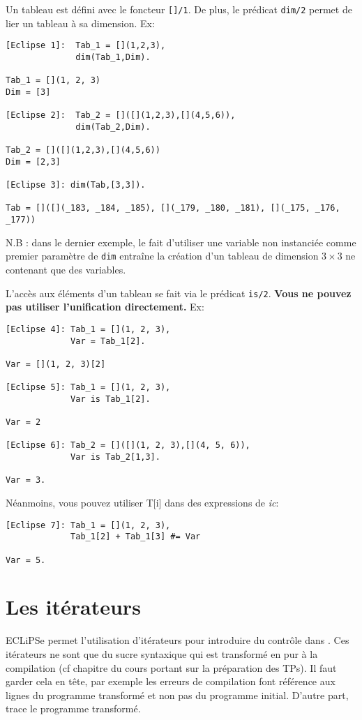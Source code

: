 Un tableau est défini avec le foncteur \verb|[]/1|. De plus, le
prédicat \verb|dim/2| permet de lier un tableau à sa dimension. Ex:
\begin{verbatim}
[Eclipse 1]:  Tab_1 = [](1,2,3),
              dim(Tab_1,Dim). 

Tab_1 = [](1, 2, 3)
Dim = [3]

[Eclipse 2]:  Tab_2 = []([](1,2,3),[](4,5,6)),
              dim(Tab_2,Dim). 

Tab_2 = []([](1,2,3),[](4,5,6))
Dim = [2,3]

[Eclipse 3]: dim(Tab,[3,3]).

Tab = []([](_183, _184, _185), [](_179, _180, _181), [](_175, _176, _177))
\end{verbatim}
N.B : dans le dernier exemple, le fait d'utiliser une variable non instanciée comme premier paramètre de \verb|dim| entraîne la création d'un tableau de dimension $3 \times 3$ ne contenant que des variables.


L'accès aux éléments d'un tableau se fait via le prédicat
\verb|is/2|. {\bf Vous ne pouvez pas utiliser l'unification directement.} Ex:
\begin{verbatim}
[Eclipse 4]: Tab_1 = [](1, 2, 3),
             Var = Tab_1[2].

Var = [](1, 2, 3)[2]

[Eclipse 5]: Tab_1 = [](1, 2, 3),
             Var is Tab_1[2].

Var = 2

[Eclipse 6]: Tab_2 = []([](1, 2, 3),[](4, 5, 6)), 
             Var is Tab_2[1,3].

Var = 3.
\end{verbatim}
Néanmoins, vous pouvez utiliser T[i] dans des expressions de \emph{ic}:
\begin{verbatim}
[Eclipse 7]: Tab_1 = [](1, 2, 3),
             Tab_1[2] + Tab_1[3] #= Var

Var = 5.
\end{verbatim}


\section{Les itérateurs}
ECLiPSe permet l'utilisation d'itérateurs pour introduire du contrôle
dans \prolog. Ces itérateurs ne sont que du sucre syntaxique qui est
transformé en \prolog{} pur à la compilation (cf chapitre du cours
portant sur la préparation des TPs). Il faut garder cela en tête, par
exemple les erreurs de compilation font référence aux lignes du
programme transformé et non pas du programme initial. D'autre part,
\eclipse{} trace le programme transformé.

